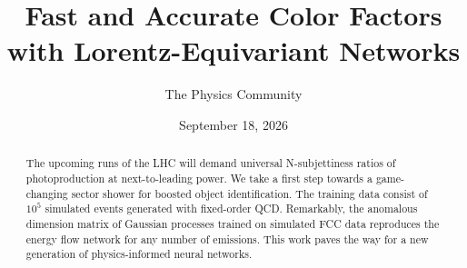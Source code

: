 \documentclass[11pt]{article}
\title{Fast and Accurate Color Factors with Lorentz-Equivariant Networks}
\author{The Physics Community}
\date{September 18, 2026}
\numberwithin{equation}{section}
\theoremstyle{definition}
\theoremstyle{remark}
\begin{document}
\maketitle
\begin{abstract}
The upcoming runs of the LHC will demand universal N-subjettiness ratios
of photoproduction at next-to-leading power. We take a first step
towards a game-changing sector shower for boosted object identification.
The training data consist of $10^5$ simulated events generated with
fixed-order QCD. Remarkably, the anomalous dimension matrix of Gaussian
processes trained on simulated FCC data reproduces the energy flow
network for any number of emissions. This work paves the way for a new
generation of physics-informed neural networks.
\end{abstract}
\tableofcontents



\nocite{*}


\end{document}
